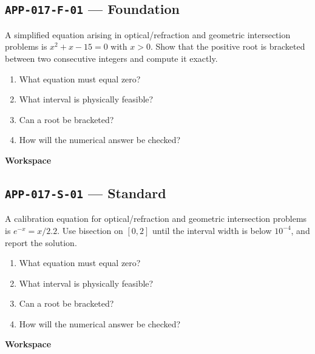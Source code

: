\documentclass[11pt]{book}
\newcommand{\pid}[1]{\texttt{#1}}
\newcommand{\workspace}{\par\vspace{0.7in}\hrulefill\par\vspace{0.55in}\hrulefill\par}
\begin{document}
\subsection*{\pid{APP-017-F-01} — Foundation}
\begin{problembox}
A simplified equation arising in optical/refraction and geometric intersection problems is $x^2+x-15=0$ with $x>0$. Show that the positive root is bracketed between two consecutive integers and compute it exactly.
\end{problembox}
\begin{promptbox}\begin{enumerate}
\item What equation must equal zero?
\item What interval is physically feasible?
\item Can a root be bracketed?
\item How will the numerical answer be checked?
\end{enumerate}\end{promptbox}
\textbf{Workspace}\workspace
{}
\subsection*{\pid{APP-017-S-01} — Standard}
\begin{problembox}
A calibration equation for optical/refraction and geometric intersection problems is $e^{-x}=x/2.2$. Use bisection on $[0,2]$ until the interval width is below $10^{-4}$, and report the solution.
\end{problembox}
\begin{promptbox}\begin{enumerate}
\item What equation must equal zero?
\item What interval is physically feasible?
\item Can a root be bracketed?
\item How will the numerical answer be checked?
\end{enumerate}\end{promptbox}
\textbf{Workspace}\workspace
{}
\end{document}
